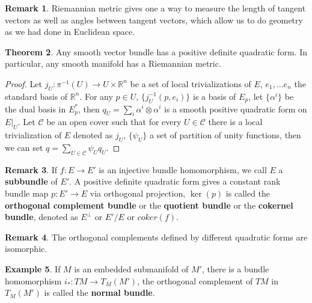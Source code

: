 \documentclass{article}
\theoremstyle{definition}
\newtheorem{thm}{Theorem}[section]
\newtheorem{rmk}[thm]{Remark}
\newtheorem{exm}[thm]{Example}
\begin{document}
\begin{rmk}
    Riemannian metric gives one a way to measure the length of tangent vectors as well as angles between tangent vectors, which allow us to do geometry as we had done in Euclidean space.
\end{rmk}

\begin{thm}\label{extrie}
    Any smooth vector bundle has a positive definite quadratic form. In particular, any smooth manifold has a Riemannian metric.
\end{thm}

\begin{proof}
    Let $j_U: \pi^{-1}(U)\rightarrow U\times\mathbb{R}^n$ be a set of local trivializations of $E$, $e_1, \dots e_n$ the standard basis of $\mathbb{R}^n$. For any $p\in U$, $\{j_U^{-1}(p, e_i)\}$ is a basis of $E_p$, let $\{\alpha^i\}$ be the dual basis in $E_p^*$, then $q_U=\sum_i\alpha^i\otimes\alpha^i$ is a smooth positive quadratic form on $E|_U$. Let $\mathcal{C}$ be an open cover such that for every $U\in \mathcal{C}$ there is a local trivialization of $E$ denoted as $j_U$, $\{\psi_U\}$ a set of partition of unity functions, then we can set $q=\sum_{U\in\mathcal{C}}\psi_Uq_U$.
\end{proof}

\begin{rmk}
    If $f: E\rightarrow E'$ is an injective bundle homomorphism, we call $E$ a {\bf subbundle} of $E'$. A positive definite quadratic form gives a constant rank bundle map $p: E'\rightarrow E$ via orthogonal projection, $\ker(p)$ is called the {\bf orthogonal complement bundle} or the {\bf quotient bundle} or the {\bf cokernel bundle}, denoted as $E^\perp$ or $E'/E$ or $coker(f)$.
\end{rmk} 

\begin{rmk}
    The orthogonal complements defined by different quadratic forms are isomorphic.
\end{rmk}


\begin{exm}
    If $M$ is an embedded submanifold of $M'$, there is a bundle homomorphism $i_*: TM\rightarrow T_M(M')$, the orthogonal complement of $TM$ in $T_M(M')$ is called the {\bf normal bundle}. 
\end{exm}
\end{document}
